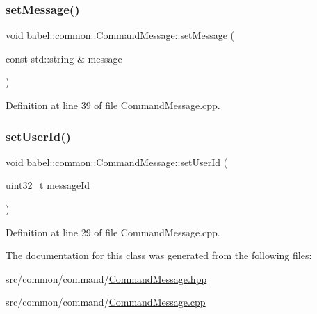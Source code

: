 \subsubsection{\texorpdfstring{set\+Message()}{setMessage()}}
{\footnotesize\ttfamily void babel\+::common\+::\+Command\+Message\+::set\+Message (\begin{DoxyParamCaption}\item[{const std\+::string \&}]{message }\end{DoxyParamCaption})}



Definition at line 39 of file Command\+Message.\+cpp.

\mbox{\label{classbabel_1_1common_1_1_command_message_a9cdc433b630a17b5468ca341f5a2b932}} 
\subsubsection{\texorpdfstring{set\+User\+Id()}{setUserId()}}
{\footnotesize\ttfamily void babel\+::common\+::\+Command\+Message\+::set\+User\+Id (\begin{DoxyParamCaption}\item[{uint32\+\_\+t}]{message\+Id }\end{DoxyParamCaption})}



Definition at line 29 of file Command\+Message.\+cpp.



The documentation for this class was generated from the following files\+:\begin{DoxyCompactItemize}
\item 
src/common/command/\mbox{\hyperlink{_command_message_8hpp}{Command\+Message.\+hpp}}\item 
src/common/command/\mbox{\hyperlink{_command_message_8cpp}{Command\+Message.\+cpp}}\end{DoxyCompactItemize}
